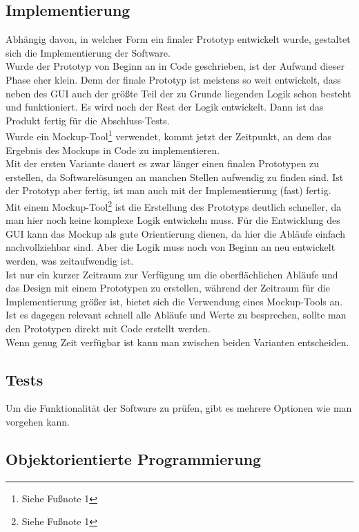 \documentclass[a4paper,12pt,top=2.5cm,bottom=2.5cm, left=2.5cm, right=2.5cm, numbers=noenddot]{scrartcl}
\begin{document}
\subsection{Implementierung}
Abhängig davon, in welcher Form ein finaler Prototyp entwickelt wurde, gestaltet sich die Implementierung der Software.
\\Wurde der Prototyp von Beginn an in Code geschrieben, ist der Aufwand dieser Phase eher klein. Denn der finale Prototyp ist meistens so weit entwickelt, dass neben des GUI auch der größte Teil der zu Grunde liegenden Logik schon besteht und funktioniert. Es wird noch der Rest der Logik entwickelt. Dann ist das Produkt fertig für die Abschluss-Tests.\\Wurde ein Mockup-Tool\footnote{Siehe Fußnote 1} verwendet, kommt jetzt der Zeitpunkt, an dem das Ergebnis des Mockups in Code zu implementieren. 
\\Mit der ersten Variante dauert es zwar länger einen finalen Prototypen zu erstellen, da Softwarelösungen an manchen Stellen aufwendig zu finden sind. Ist der Prototyp aber fertig, ist man auch mit der Implementierung (fast) fertig. 
\\Mit einem Mockup-Tool\footnote{Siehe Fußnote 1} ist die Erstellung des Prototyps deutlich schneller, da man hier noch keine komplexe Logik entwickeln muss. Für die Entwicklung des GUI kann das Mockup als gute Orientierung dienen, da hier die Abläufe einfach nachvollziehbar sind. Aber die Logik muss noch von Beginn an neu entwickelt werden, was zeitaufwendig ist. 
\\Ist nur ein kurzer Zeitraum zur Verfügung um die oberflächlichen Abläufe und das Design mit einem Prototypen zu erstellen, während der Zeitraum für die Implementierung größer ist, bietet sich die Verwendung eines Mockup-Tools an. Ist es dagegen relevant schnell alle Abläufe und Werte zu besprechen, sollte man den Prototypen direkt mit Code erstellt werden.\\
Wenn genug Zeit verfügbar ist kann man zwischen beiden Varianten entscheiden.
\subsection{Tests}
Um die Funktionalität der Software zu prüfen, gibt es mehrere Optionen wie man vorgehen kann.

\subsection{Objektorientierte Programmierung}
\label{Objektorientierte Programmierung}
\end{document}
